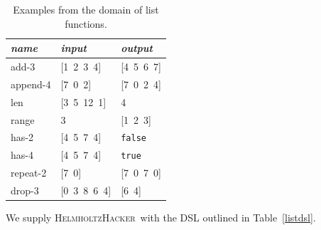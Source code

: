\documentclass{article}
\newcommand{\system}{\textsc{HelmholtzHacker}~}
\begin{document}
\begin{table}
\centering
\begin{tabular}{| l | l | l |}
  \hline
  \emph{name} & \emph{input} & \emph{output} \\
  \hline
  add-3 & [1\, 2\, 3\, 4] & [4\, 5\, 6\, 7] \\
  append-4 & [7\, 0\, 2] & [7\, 0\, 2\, 4] \\
  len & [3\, 5\, 12\, 1] & 4 \\
  range & 3 & [1\, 2\, 3] \\
  has-2 & [4\, 5\, 7\, 4] & \texttt{false} \\
  has-4 & [4\, 5\, 7\, 4] & \texttt{true} \\
  repeat-2 & [7\, 0] & [7\, 0\, 7\, 0] \\
  drop-3 & [0\, 3\, 8\, 6\, 4] & [6\, 4] \\
  \hline
\end{tabular}
\caption{Examples from the domain of list functions.}
\label{listexamples}
\end{table}

We supply \system with the DSL outlined in Table~\ref{listdsl}.
\end{document}
